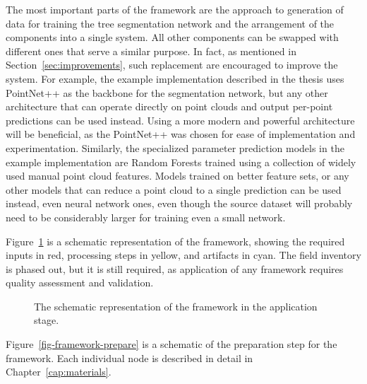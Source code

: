 The most important parts of the framework are the approach to generation of data for training the tree segmentation network and the arrangement of the components into a single system.
All other components can be swapped with different ones that serve a similar purpose.
In fact, as mentioned in Section~\ref{sec:improvements}, such replacement are encouraged to improve the system.
For example, the example implementation described in the thesis uses PointNet++ as the backbone for the segmentation network, but any other architecture that can operate directly on point clouds and output per-point predictions can be used instead.
Using a more modern and powerful architecture will be beneficial, as the PointNet++ was chosen for ease of implementation and experimentation.
Similarly, the specialized parameter prediction models in the example implementation are Random Forests trained using a collection of widely used manual point cloud features.
Models trained on better feature sets, or any other models that can reduce a point cloud to a single prediction can be used instead, even neural network ones, even though the source dataset will probably need to be considerably larger for training even a small network.

Figure~\ref{fig-framework-apply} is a schematic representation of the framework, showing the required inputs in red, processing steps in yellow, and artifacts in cyan.
The field inventory is phased out, but it is still required, as application of any framework requires quality assessment and validation.

\begin{figure}
\caption[Schematic representation of the framework: application]{\label{fig-framework-apply}The schematic representation of the
framework in the application stage.}
\end{figure}

Figure~\ref{fig-framework-prepare} is a schematic of the preparation step for the framework.
Each individual node is described in detail in Chapter~\ref{cap:materials}.


